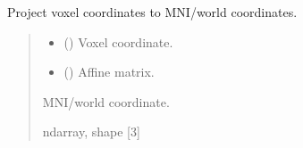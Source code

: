 \documentclass[letterpaper,10pt,english]{sphinxhowto}
\begin{document}
\begin{fulllineitems}
\label{\detokenize{stuff:neurora.stuff.position_to_mni}}
\pysigstartsignatures
{}
\pysigstopsignatures
\sphinxAtStartPar
Project voxel coordinates to MNI/world coordinates.
\begin{quote}\begin{description}
\begin{itemize}
\item {} 
\sphinxAtStartPar
{} (\sphinxstyleliteralemphasis{\sphinxupquote{, }}\sphinxstyleliteralemphasis{\sphinxupquote{ {[}}}\sphinxstyleliteralemphasis{\sphinxupquote{{]}}}) \textendash{} Voxel coordinate.

\item {} 
\sphinxAtStartPar
{} (\sphinxstyleliteralemphasis{\sphinxupquote{, }}\sphinxstyleliteralemphasis{\sphinxupquote{ {[}}}\sphinxstyleliteralemphasis{\sphinxupquote{, }}\sphinxstyleliteralemphasis{\sphinxupquote{{]}}}) \textendash{} Affine matrix.

\end{itemize}

\sphinxAtStartPar
{} \textendash{} MNI/world coordinate.

\sphinxAtStartPar
ndarray, shape {[}3{]}

\end{description}\end{quote}

\end{fulllineitems}

\end{document}
